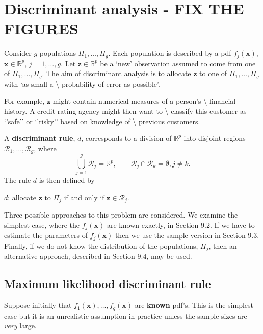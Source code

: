 \documentclass[]{book}
\theoremstyle{definition}
\theoremstyle{definition}
\theoremstyle{definition}
\theoremstyle{remark}
\begin{document}
\hypertarget{lda}{%
\chapter{Discriminant analysis - FIX THE FIGURES}\label{lda}}

Consider \(g\) populations \(\Pi_1, \ldots , \Pi_g\). Each population is described by a pdf \(f_j(\boldsymbol x)\), \(\boldsymbol x\in \mathbb R^p\), \(j=1,\ldots , g\). Let \(\boldsymbol z\in \mathbb R^p\) be a `new' observation assumed to come from one of \(\Pi_1, \ldots , \Pi_g\). The aim of discriminant analysis is to allocate \(\boldsymbol z\) to one of \(\Pi_1, \ldots , \Pi_g\) with `as small a \textbackslash{}
probability of error as possible'.

For example, \(\boldsymbol z\) might contain numerical measures of a person's \textbackslash{}
financial history. A credit rating agency might then want to \textbackslash{}
classify this customer as `'safe'' or `'risky'' based on knowledge of \textbackslash{}
previous customers.

A \textbf{discriminant rule}, \(d\), corresponds to a division of \(\mathbb R^p\) into disjoint regions \(\mathcal R_1, \ldots, \mathcal R_g\), where
\[\bigcup_{j=1}^g \mathcal R_j = \mathbb R^p, \qquad \mathcal R_j \cap \mathcal R_k = \emptyset, j \neq k.\]
The rule \(d\) is then defined by

\begin{center}
$d$: allocate $\boldsymbol z$ to $\Pi_j$ if and only if  $\boldsymbol z\in \mathcal R_j$.
\end{center}

Three possible approaches to this problem are considered. We examine the simplest case, where the \(f_j(\boldsymbol x)\) are known exactly, in Section 9.2. If we have to estimate the parameters of \(f_j(\boldsymbol x)\) then we use the sample version in Section 9.3. Finally, if we do not know the distribution of the populations, \(\Pi_j\), then an alternative approach, described in Section 9.4, may be used.

\hypertarget{maximum-likelihood-discriminant-rule}{%
\section{Maximum likelihood discriminant rule}\label{maximum-likelihood-discriminant-rule}}

Suppose initially that \(f_1(\boldsymbol x), \ldots, f_g(\boldsymbol x)\) are \textbf{known} pdf's. This is the simplest case but it is an unrealistic assumption in practice unless the sample sizes are \emph{very} large.
\end{document}
